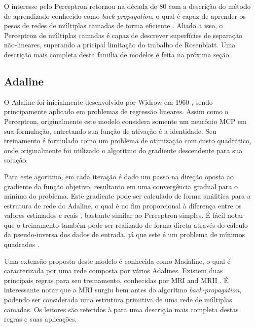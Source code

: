\documentclass[conference]{IEEEtran}
\begin{document}
	O interesse pelo Perceptron retornou na década de 80 com a descrição do método de aprendizado conhecido como \textit{back-propagation}, o qual é capaz de aprender os pesos de redes de múltiplas camadas de forma eficiente \cite{rumelhart1985learning}. Aliado a isso, o Perceptron de múltiplas camadas é capaz de descrever superfícies de separação não-lineares, superando a pricipal limitação do trabalho de Rosenblatt. Uma descrição mais completa desta família de modelos é feita na próxima seção.

	\subsection{Adaline}
	O Adaline foi inicialmente desenvolvido por Widrow em 1960 \cite{widrow1960adaptive}, sendo principamente aplicado em problemas de regressão lineares. Assim como o Perceptron, originalmente este modelo considera somente um neurônio MCP em sua formulação, entretando sua função de ativação é a identidade. Seu treinamento é formulado como um problema de otimização com custo quadrático, onde originalmente foi utilizado o algoritmo do gradiente descendente para sua solução. 
	
	Para este agoritmo, em cada iteração é dado um passo na direção oposta ao gradiente da função objetivo, resultanto em uma convergência gradual para o mínimo do problema. Este gradiente pode ser calculado de forma análitica para a estrutura de rede do Adaline, o qual é no fim proporcional à diferença entre os valores estimados e reais \cite{widrow1960adaptive}, bastante similar ao Perceptron simples. É fácil notar que o treinamento também pode ser realizado de forma direta através do cálculo da  pseudo-inversa dos dados de entrada, já que este é um problema de mínimos quadrados \cite{haykin2007neural}.
	
	Uma extensão proposta deste modelo é conhecida como Madaline, o qual é caracterizada por uma rede composta por vários Adalines. Existem duas principais regras para seu treinamento, conhecidas por MRI \cite{widrow1962generalization} and MRII \cite{winter1988madaline}. É interessante notar que a MRI surgiu bem antes do algoritmo \textit{back-propagation}, podendo ser considerada uma estrutura primitiva de uma rede de múltiplas camadas. Os leitores são referidos à \cite{widrow199030} para uma descrição mais completa destas regras e suas aplicações.
	
	   
	
	 
	
		
\end{document}
